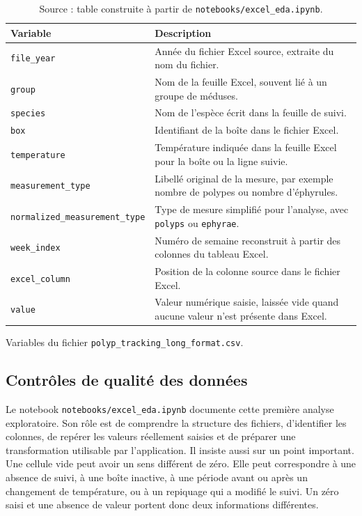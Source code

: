 \documentclass{article}
\begin{document}
\begin{table}[H]
\centering
\small
\begin{tabularx}{\textwidth}{p{}Y}
\toprule
\textbf{Variable} & \textbf{Description} \\
\midrule
\texttt{file\_year} & Année du fichier Excel source, extraite du nom du fichier. \\
\texttt{group} & Nom de la feuille Excel, souvent lié à un groupe de méduses. \\
\texttt{species} & Nom de l’espèce écrit dans la feuille de suivi. \\
\texttt{box} & Identifiant de la boîte dans le fichier Excel. \\
\texttt{temperature} & Température indiquée dans la feuille Excel pour la boîte ou la ligne suivie. \\
\texttt{measurement\_type} & Libellé original de la mesure, par exemple nombre de polypes ou nombre d’éphyrules. \\
\texttt{normalized\_measurement\_type} & Type de mesure simplifié pour l’analyse, avec \texttt{polyps} ou \texttt{ephyrae}. \\
\texttt{week\_index} & Numéro de semaine reconstruit à partir des colonnes du tableau Excel. \\
\texttt{excel\_column} & Position de la colonne source dans le fichier Excel. \\
\texttt{value} & Valeur numérique saisie, laissée vide quand aucune valeur n’est présente dans Excel. \\
\bottomrule
\end{tabularx}
\caption{Variables du fichier \texttt{polyp\_tracking\_long\_format.csv}.}
\vspace{-0.35cm}
\caption*{\footnotesize Source : table construite à partir de \texttt{notebooks/excel\_eda.ipynb}.}
\label{tab:variables-csv-long}
\end{table}

\subsection{Contrôles de qualité des données}

Le notebook \texttt{notebooks/excel\_eda.ipynb} documente cette première analyse exploratoire. Son rôle est de comprendre la structure des fichiers, d’identifier les colonnes, de repérer les valeurs réellement saisies et de préparer une transformation utilisable par l’application. Il insiste aussi sur un point important. Une cellule vide peut avoir un sens différent de zéro. Elle peut correspondre à une absence de suivi, à une boîte inactive, à une période avant ou après un changement de température, ou à un repiquage qui a modifié le suivi. Un zéro saisi et une absence de valeur portent donc deux informations différentes.
\end{document}
